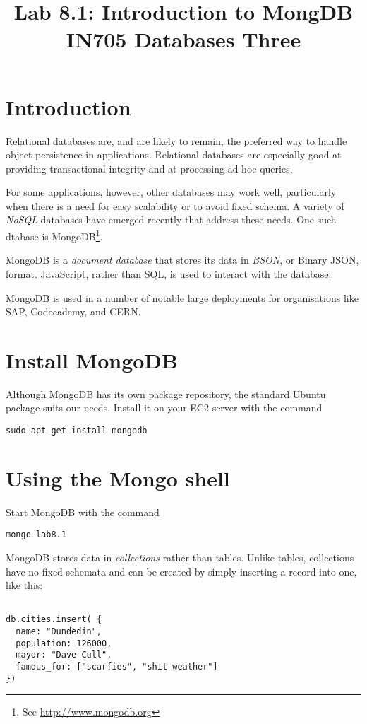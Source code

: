 \documentclass{article}
\begin{document}
\title{Lab 8.1: Introduction to MongDB\\ IN705 Databases Three}
\date{}
\maketitle

\section*{Introduction}
Relational databases are, and are likely to remain, the preferred way to handle object persistence in applications.  Relational databases are especially good at providing transactional integrity and at processing ad-hoc queries.  

For some applications, however, other databases may work well, particularly when there is a need for easy scalability or to avoid fixed schema.  A variety of \emph{NoSQL} databases have emerged recently that address these needs.  One such dtabase is MongoDB\footnote{See \url{http://www.mongodb.org}}.

MongoDB is a \emph{document database} that stores its data in \emph{BSON}, or Binary JSON, format.  JavaScript, rather than SQL, is used to interact with the database.

MongoDB is used in a number of notable large deployments for organisations like SAP, Codecademy, and CERN.

\section{Install MongoDB}
Although MongoDB has its own package repository, the standard Ubuntu package suits our needs.  Install it on your EC2 server with the command

\texttt{sudo apt-get install mongodb}

\section{Using the Mongo shell}
Start MongoDB with the command

\texttt{mongo lab8.1}

MongoDB stores data in \emph{collections} rather than tables.  Unlike tables,
collections have no fixed schemata and can be created by simply inserting a record into one, like this:

\begin{verbatim}

db.cities.insert( {
  name: "Dundedin",
  population: 126000,
  mayor: "Dave Cull",
  famous_for: ["scarfies", "shit weather"]
})

\end{verbatim}
\end{document}
